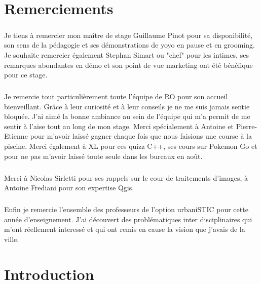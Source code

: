 \documentclass[a4paper]{report}
\begin{document}
\chapter*{Remerciements}

\paragraph{} Je tiens à remercier mon maître de stage Guillaume Pinot pour sa disponibilité, son sens de la pédagogie et ses démonstrations de yoyo en pause et en grooming.  Je souhaite remercier également Stephan Simart ou "chef" pour les intimes, ses remarques abondantes en démo et son point de vue marketing ont été bénéfique pour ce stage.

\paragraph{} Je remercie tout particulièrement toute l'équipe de RO pour son accueil bienveillant. Grâce à leur curiosité et à leur conseils je ne me suis jamais sentie bloquée. J'ai aimé la bonne ambiance au sein de l'équipe qui m'a permit de me sentir à l'aise tout au long de mon stage. Merci spécialement à Antoine et Pierre-Etienne pour m'avoir laissé gagner chaque fois que nous faisions une course à la piscine. Merci également à XL pour ces quizz C++, ses cours sur Pokemon Go et pour ne pas m'avoir laissé toute seule dans les bureaux en août.

\paragraph{} Merci à Nicolas Sirletti pour ses rappels sur le cour de traitements d'images, à Antoine Frediani pour son expertise Qgis.

\paragraph{} Enfin je remercie l'ensemble des professeurs de l'option urbaniSTIC pour cette année d'enseignement. J'ai découvert des problématiques inter disciplinaires qui m'ont réellement interessé et qui ont remis en cause la vision que j'avais de la ville.	

\newpage

\chapter*{Introduction}
	
\end{document}
